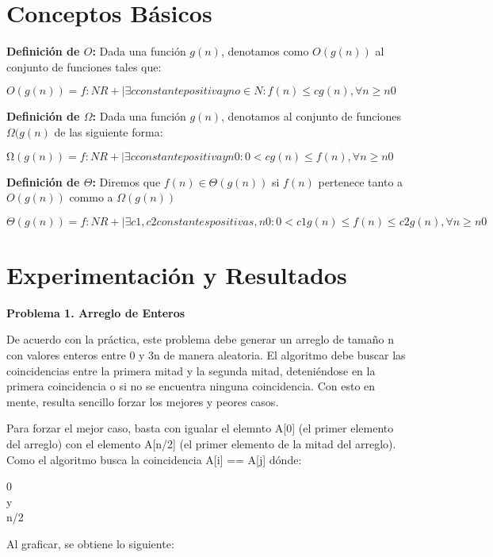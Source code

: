 \documentclass[12pt,twoside]{article}
\begin{document}
\vspace{5mm} %

\section{Conceptos B\'asicos}
\textbf{Definici\'on de $O$:} Dada una funci\'on $g(n)$, denotamos como $O(g(n))$ al conjunto de funciones tales que:

$O(g(n)) = {f:NR+| ∃c constante positiva y no∈N : f(n) ≤cg(n), ∀n ≥n0}$

\textbf{Definici\'on de $\Omega$:} Dada una funci\'on $g(n)$, denotamos al conjunto de funciones $\Omega(g(n)$ de las siguiente forma:

$Ω(g(n)) = {f:NR+| ∃c constante positiva y n0: 0 < cg(n) ≤f(n), ∀n ≥n0}$

\textbf{Definici\'on de $\Theta$:} Diremos que $ f(n)∈Θ(g(n))$ si $f(n)$ pertenece tanto a $O(g(n))$ commo a $\Omega(g(n))$

$Θ(g(n)) = {f:NR+| ∃c1,c2constantes positivas, n0: 0 < c1g(n) ≤f(n) ≤c2g(n),  ∀n ≥n0}$
\newpage
\section{Experimentaci\'on y Resultados}
\textbf{Problema 1. Arreglo de Enteros}

De acuerdo con la pr\'actica, este problema debe generar un arreglo de tamaño n con valores enteros entre 0 y 3n de manera aleatoria. El algoritmo debe buscar las coincidencias entre la primera mitad y la segunda mitad, deteni\'endose en la primera coincidencia o si no se encuentra ninguna coincidencia. Con esto en mente, resulta sencillo forzar los mejores y peores casos.

\vspace{5mm} %

Para forzar el mejor caso, basta con igualar el elemnto A[0] (el primer elemento del arreglo) con el elemento A[n/2] (el primer elemento de la mitad del arreglo). Como el algoritmo busca la coincidencia A[i] == A[j] d\'onde:

\begin{center}
    0\\y\\n/2\\
\end{center}

Al graficar, se obtiene lo siguiente:
\medskip
\end{document}
